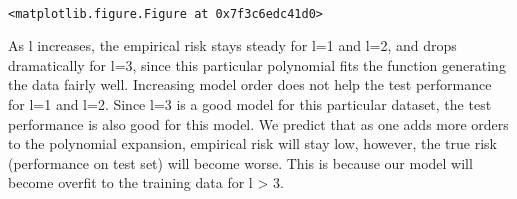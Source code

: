 \documentclass[11pt]{article}
\begin{document}
    \begin{center}
    \end{center}
    { \hspace*{\fill} \\}


    \begin{verbatim}
<matplotlib.figure.Figure at 0x7f3c6edc41d0>
    \end{verbatim}


    As l increases, the empirical risk stays steady for l=1 and l=2, and
drops dramatically for l=3, since this particular polynomial fits the
function generating the data fairly well. Increasing model order does
not help the test performance for l=1 and l=2. Since l=3 is a good model
for this particular dataset, the test performance is also good for this
model. We predict that as one adds more orders to the polynomial expansion,
empirical risk will stay low, however, the true risk (performance on test set)
will become worse. This is because our model will become overfit to the training
data for l > 3.





    
\end{document}
